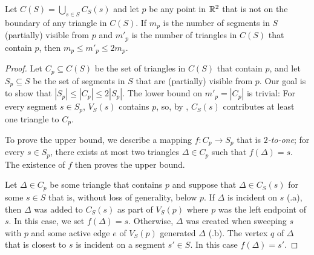 \documentclass{patmorin}
\begin{document}
\begin{lem}
Let $C(S)=\bigcup_{s\in S} C_S(s)$ and let $p$ be any point in $\mathbb{R}^2$ that
is not on the boundary of any triangle in $C(S)$.  If $m_p$ is the number
of segments in $S$ (partially) visible from $p$ and $m'_p$ is the number
of triangles in $C(S)$ that contain $p$, then $m_p \le m'_p \le 2m_p$.
\end{lem}
\begin{proof}
Let $C_p\subseteq C(S)$ be the set of triangles in $C(S)$ that contain
$p$, and let $S_p\subseteq S$ be the set of segments in $S$ that are
(partially) visible from $p$.  Our goal is to show that $|S_p|\le |C_p|\le
2|S_p|$. The lower bound on $m'_p=|C_p|$ is trivial: For every segment
$s\in S_p$, $V_S(s)$ contains $p$, so, by , $C_S(s)$
contributes at least one triangle to $C_p$.

To prove the upper bound, we describe a mapping $f: C_p \rightarrow S_p$
that is \emph{$2$-to-one}; for every $s\in S_p$, there exists at most two
triangles $\Delta\in C_p$ such that $f(\Delta)=s$. The existence of $f$
then proves the upper bound.

Let $\Delta\in C_p$ be some triangle that contains $p$ and suppose that
$\Delta\in C_S(s)$ for some $s\in S$ that is, without loss of generality,
below $p$.  If $\Delta$ is incident on $s$ (.a), then $\Delta$ was added to
$C_S(s)$ as part of $V_S(p)$ where $p$ was the left endpoint of $s$.  In
this case, we set $f(\Delta)=s$.  Otherwise, $\Delta$ was created when
sweeping $s$ with $p$ and some active edge $e$ of $V_S(p)$ generated
$\Delta$ (.b).  The vertex $q$ of $\Delta$ that is closest to $s$ is incident on a
segment $s'\in S$.  In this case $f(\Delta)=s'$.


\end{proof}
\end{document}
